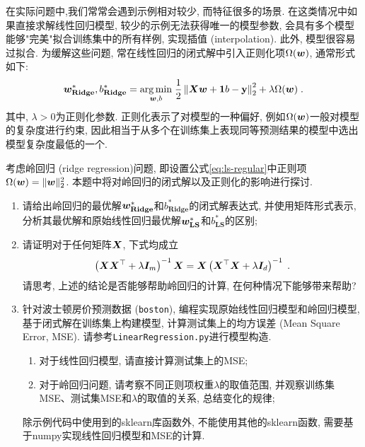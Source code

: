 \documentclass[answers]{exam}  %
\begin{document}
\begin{questions}
在实际问题中,我们常常会遇到示例相对较少, 而特征很多的场景. 在这类情况中如果直接求解线性回归模型, 较少的示例无法获得唯一的模型参数, 会具有多个模型能够"完美"拟合训练集中的所有样例, 实现插值 (interpolation). 此外, 模型很容易过拟合. 为缓解这些问题, 常在线性回归的闭式解中引入正则化项$\Omega(\boldsymbol{w})$, 通常形式如下: 
\begin{equation}
  \boldsymbol{w}_{\mathbf{Ridge}}^{*}, b_{\mathbf{Ridge}}^{*}=\underset{\boldsymbol{w}, b}{\arg \min }\; \frac{1}{2}\left\|\boldsymbol{X} \boldsymbol{w}+\boldsymbol{1} b-\mathbf{y}\right\|_{2}^{2}+\lambda \Omega(\boldsymbol{w})  \label{eq:ls-regular}\;.
\end{equation}
其中, $\lambda > 0$为正则化参数. 正则化表示了对模型的一种偏好, 例如$\Omega(\boldsymbol{w})$一般对模型的复杂度进行约束, 因此相当于从多个在训练集上表现同等预测结果的模型中选出模型复杂度最低的一个. 

考虑岭回归 (ridge regression)问题, 即设置公式\eqref{eq:ls-regular}中正则项$\Omega(\boldsymbol{w}) = \lVert \boldsymbol{w}\rVert_2^2$. 本题中将对岭回归的闭式解以及正则化的影响进行探讨.
\begin{enumerate}
    \item 请给出岭回归的最优解$\boldsymbol{w}_{\mathbf{Ridge}}^*$和$b_{\mathbf{Ridge}}^*$的闭式解表达式, 并使用矩阵形式表示, 分析其最优解和原始线性回归最优解$\boldsymbol{w}_{\mathbf{LS}}^*$和$b_{\mathbf{LS}}^*$的区别;
    \item 请证明对于任何矩阵$\boldsymbol{X}$, 下式均成立
    \begin{align}
    	\left(\boldsymbol{X} \boldsymbol{X}^{\top}+\lambda \boldsymbol{I}_m\right)^{-1} \boldsymbol{X}=\boldsymbol{X}\left(\boldsymbol{X}^{\top} \boldsymbol{X}+\lambda \boldsymbol{I}_d\right)^{-1}\;.
    \end{align}
    请思考, 上述的结论是否能够帮助岭回归的计算, 在何种情况下能够带来帮助?
    \item 针对波士顿房价预测数据 (\lstinline{boston}), 编程实现原始线性回归模型和岭回归模型, 基于闭式解在训练集上构建模型, 计算测试集上的均方误差 (Mean Square Error, MSE). 请参考\lstinline{LinearRegression.py}进行模型构造. 
    
    \begin{enumerate}
        \item 对于线性回归模型, 请直接计算测试集上的MSE;
        \item 对于岭回归问题, 请考察不同正则项权重$\lambda$的取值范围, 并观察训练集MSE、测试集MSE和$\lambda$的取值的关系, 总结变化的规律;
    \end{enumerate} 除示例代码中使用到的sklearn库函数外, 不能使用其他的sklearn函数, 需要基于numpy实现线性回归模型和MSE的计算.
\end{enumerate}
	\begin{solution}

\end{solution}
\end{questions}
\end{document}
